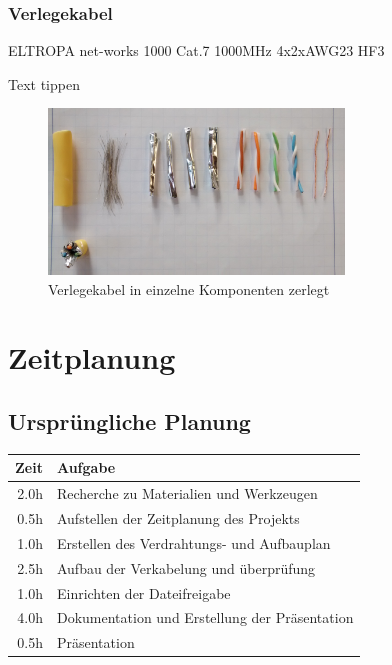\documentclass[
a4paper,     %
 headsepline, %
11pt         %
]{scrartcl}  %
\begin{document}
\subsubsection{Verlegekabel}
ELTROPA net-works 1000 Cat.7 1000MHz 4x2xAWG23 HF3

Text tippen
\begin{figure}[htbp] 
	\centering
	\includegraphics[width=0.7\textwidth]{verlegekabel.jpg}
	\caption{Verlegekabel in einzelne Komponenten zerlegt}
	\label{fig:Kabel1}
\end{figure}


\section{Zeitplanung}
\subsection{Ursprüngliche Planung}
\begin{tabular}{ r | l }
	\hline 
	Zeit &	Aufgabe \\ \hline
	2.0h &	Recherche zu Materialien und Werkzeugen \\
	0.5h &	Aufstellen der Zeitplanung des Projekts \\
	1.0h &	Erstellen des Verdrahtungs- und Aufbauplan \\
	2.5h &	Aufbau der Verkabelung und überprüfung \\
	1.0h &	Einrichten der Dateifreigabe \\
	4.0h &	Dokumentation und Erstellung der Präsentation \\
	0.5h & 	Präsentation \\
	\hline
\end{tabular}
\end{document}
